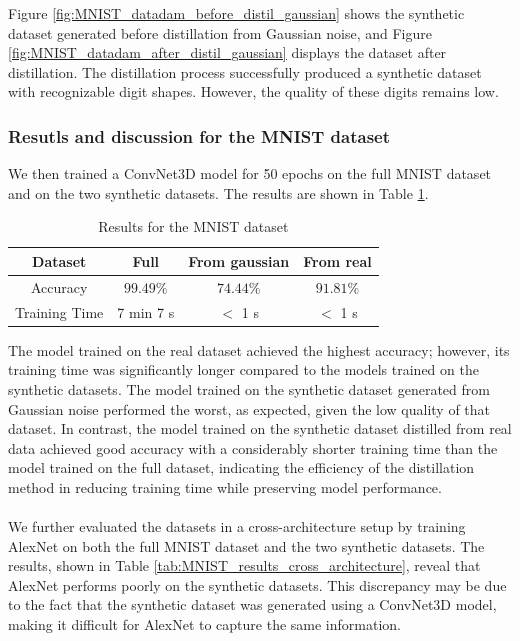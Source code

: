 \documentclass[onecolumn]{IEEEtran}
\begin{document}
Figure \ref{fig:MNIST_datadam_before_distil_gaussian} shows the synthetic dataset generated before distillation from Gaussian noise, and Figure \ref{fig:MNIST_datadam_after_distil_gaussian} displays the dataset after distillation. The distillation process successfully produced a synthetic dataset with recognizable digit shapes. However, the quality of these digits remains low.
\\
\subsubsection{Resutls and discussion for the MNIST dataset}
We then trained a ConvNet3D model for 50 epochs on the full MNIST dataset and on the two synthetic datasets. The results are shown in Table \ref{tab:MNIST_results}.

\begin{table}[H]
    \centering
    \begin{tabular}{|c|c|c|c|}
        \hline
        Dataset & Full & From gaussian & From real \\
        \hline
        Accuracy & $99.49\%$ & $74.44\%$ & $91.81\%$ \\
        \hline
        Training Time & 7 min 7 s & $<$ 1 s & $<$ 1 s \\
        \hline
    \end{tabular}
    \caption{Results for the MNIST dataset}
    \label{tab:MNIST_results}
\end{table}

The model trained on the real dataset achieved the highest accuracy; however, its training time was significantly longer compared to the models trained on the synthetic datasets. The model trained on the synthetic dataset generated from Gaussian noise performed the worst, as expected, given the low quality of that dataset. In contrast, the model trained on the synthetic dataset distilled from real data achieved good accuracy with a considerably shorter training time than the model trained on the full dataset, indicating the efficiency of the distillation method in reducing training time while preserving model performance.
\\
\\
We further evaluated the datasets in a cross-architecture setup by training AlexNet on both the full MNIST dataset and the two synthetic datasets. The results, shown in Table \ref{tab:MNIST_results_cross_architecture}, reveal that AlexNet performs poorly on the synthetic datasets. This discrepancy may be due to the fact that the synthetic dataset was generated using a ConvNet3D model, making it difficult for AlexNet to capture the same information.
\end{document}
